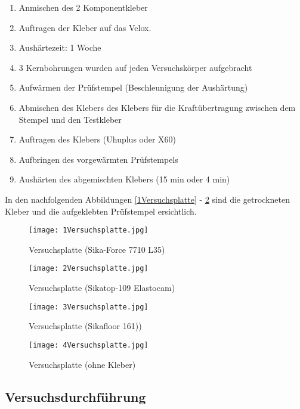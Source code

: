 \documentclass[12 pt,a4 paper ]{scrreprt}
\begin{document}
\begin{enumerate}
\item Anmischen des 2 Komponentkleber
\item Auftragen der Kleber auf das Velox.
\item Aushärtezeit:  1 Woche
\item 3 Kernbohrungen wurden auf jeden Versuchskörper aufgebracht
\item Aufwärmen der Prüfstempel (Beschleunigung der Aushärtung)
\item Abmischen des Klebers des Klebers für die Kraftübertragung zwischen dem Stempel und den Testkleber
\item Auftragen des Klebers (Uhuplus oder X60)
\item Aufbringen des vorgewärmten Prüfstempels
\item Aushärten des abgemischten Klebers (15 min oder 4 min)
\end{enumerate}

\newpage{}
In den nachfolgenden Abbildungen \ref{1Versuchsplatte} - \ref{4Versuchsplatte} sind die getrockneten Kleber und die aufgeklebten Prüfstempel ersichtlich.

\begin{figure}[h]
\begin{minipage}[hbt]{7cm}	
	\texttt{[image: 1Versuchsplatte.jpg]}
	\caption{Versuchsplatte (Sika-Force 7710 L35)}
	\label{1Versuchsplatte}
\end{minipage}
\hfill
\begin{minipage}[hbt]{7cm}
	\texttt{[image: 2Versuchsplatte.jpg]}
	\caption{Versuchsplatte (Sikatop-109 Elastocam)}
	\label{2Versuchsplatte}
\end{minipage}
\end{figure}


\begin{figure}[h]
\begin{minipage}[hbt]{7cm}	
	\texttt{[image: 3Versuchsplatte.jpg]}
	\caption{Versuchsplatte (Sikafloor 161))}
	\label{3Versuchsplatte}
\end{minipage}
\hfill
\begin{minipage}[hbt]{7cm}
	\texttt{[image: 4Versuchsplatte.jpg]}
	\caption{Versuchsplatte (ohne Kleber)}
	\label{4Versuchsplatte}
\end{minipage}
\end{figure}

\subsection{Versuchsdurchführung}
\end{document}
